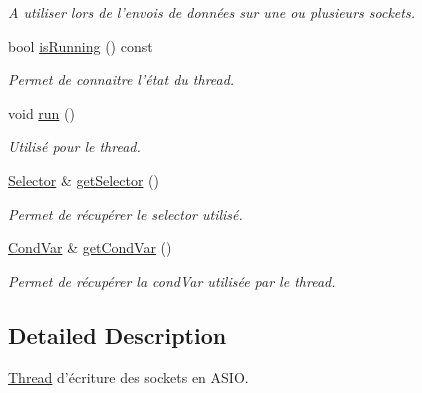 \begin{DoxyCompactItemize}
\begin{DoxyCompactList}\small\item\em A utiliser lors de l'envois de données sur une ou plusieurs sockets. \end{DoxyCompactList}\item 
bool \hyperlink{classmognetwork_1_1_tcp_a_s_i_o_writer_a0117301d2bb36f3d2b44039e16dd286d}{is\-Running} () const 
\begin{DoxyCompactList}\small\item\em Permet de connaitre l'état du thread. \end{DoxyCompactList}\item 
\hypertarget{classmognetwork_1_1_tcp_a_s_i_o_writer_ab3d1361bd19d8d09b278f9a361b058ea}{void \hyperlink{classmognetwork_1_1_tcp_a_s_i_o_writer_ab3d1361bd19d8d09b278f9a361b058ea}{run} ()}\label{classmognetwork_1_1_tcp_a_s_i_o_writer_ab3d1361bd19d8d09b278f9a361b058ea}

\begin{DoxyCompactList}\small\item\em Utilisé pour le thread. \end{DoxyCompactList}\item 
\hyperlink{classmognetwork_1_1_selector}{Selector} \& \hyperlink{classmognetwork_1_1_tcp_a_s_i_o_writer_ab7f6474ccd1082d2fc9f8acd2be87d3c}{get\-Selector} ()
\begin{DoxyCompactList}\small\item\em Permet de récupérer le selector utilisé. \end{DoxyCompactList}\item 
\hyperlink{classmognetwork_1_1_cond_var}{Cond\-Var} \& \hyperlink{classmognetwork_1_1_tcp_a_s_i_o_writer_ad312e3f3f5bd50ca728fec3e1c4476e6}{get\-Cond\-Var} ()
\begin{DoxyCompactList}\small\item\em Permet de récupérer la cond\-Var utilisée par le thread. \end{DoxyCompactList}\end{DoxyCompactItemize}


\subsection{Detailed Description}
\hyperlink{classmognetwork_1_1_thread}{Thread} d'écriture des sockets en A\-S\-I\-O. 

